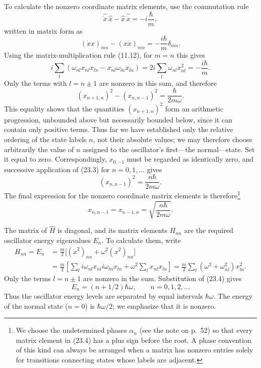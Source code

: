 To calculate the nonzero coordinate matrix elements, use the commutation rule
\[
  \hat{\dot x}\,\hat x-\hat x\,\hat{\dot x}
  =-i\frac{\hbar}{m},
\]
written in matrix form as
\[
  (\dot x x)_{mn}-(x\dot x)_{mn}=-\frac{i\hbar}{m}\delta_{mn}.
\]
Using the matrix-multiplication rule (11.12), for $m=n$ this gives
\[
  i\sum_l(\omega_{nl}x_{nl}x_{ln}-x_{nl}\omega_{ln}x_{ln})
  =2i\sum_l\omega_{nl}x_{nl}^2=-\frac{i\hbar}{m}.
\]
Only the terms with $l=n\pm1$ are nonzero in this sum, and therefore
\begin{equation}
  (x_{n+1,n})^2-(x_{n,n-1})^2=\frac{\hbar}{2m\omega}.
  \tag{23.3}
\end{equation}
This equality shows that the quantities $(x_{n+1,n})^2$ form an arithmetic
progression, unbounded above but necessarily bounded below, since it can
contain only positive terms. Thus far we have established only the relative
ordering of the state labels $n$, not their absolute values; we may therefore
choose arbitrarily the value of $n$ assigned to the oscillator's first---the
normal---state. Set it equal to zero. Correspondingly, $x_{0,-1}$ must be
regarded as identically zero,
and successive application of (23.3) for $n=0,1,\ldots$ gives
\[
  (x_{n,n-1})^2=\frac{n\hbar}{2m\omega}.
\]
The final expression for the nonzero coordinate matrix elements is
therefore\footnote{We choose the undetermined phases $\alpha_n$ (see the note
on p.~52) so that every matrix element in (23.4) has a plus sign before the
root. A phase convention of this kind can always be arranged when a matrix
has nonzero entries solely for transitions connecting states whose labels are
adjacent.}
\begin{equation}
  x_{n,n-1}=x_{n-1,n}=\sqrt{\frac{n\hbar}{2m\omega}}.
  \tag{23.4}
\end{equation}

The matrix of $\hat H$ is diagonal, and its matrix elements $H_{nn}$ are the
required oscillator energy eigenvalues $E_n$. To calculate them, write
\begin{align*}
  H_{nn}=E_n
  &=\frac m2\bigl[(\dot x^2)_{nn}+\omega^2(x^2)_{nn}\bigr]\\
  &=\frac m2\left[\sum_l i\omega_{nl}x_{nl}i\omega_{ln}x_{ln}
    +\omega^2\sum_lx_{nl}x_{ln}\right]
  =\frac m2\sum_l(\omega^2+\omega_{nl}^2)x_{ln}^2.
\end{align*}
Only the terms $l=n\pm1$ are nonzero in the sum. Substitution of (23.4) gives
\begin{equation}
  E_n=(n+1/2)\hbar\omega,\qquad n=0,1,2,\ldots
  \tag{23.5}
\end{equation}
Thus the oscillator energy levels are separated by equal intervals
$\hbar\omega$. The energy of the normal state ($n=0$) is $\hbar\omega/2$;
we emphasize that it is nonzero.

